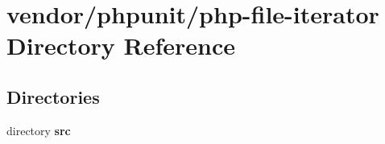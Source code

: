\section{vendor/phpunit/php-\/file-\/iterator Directory Reference}
\label{dir_eebd258bb8a686cb64d4ba0246096811}
\subsection*{Directories}
\begin{DoxyCompactItemize}
\item 
directory {\bf src}
\end{DoxyCompactItemize}
